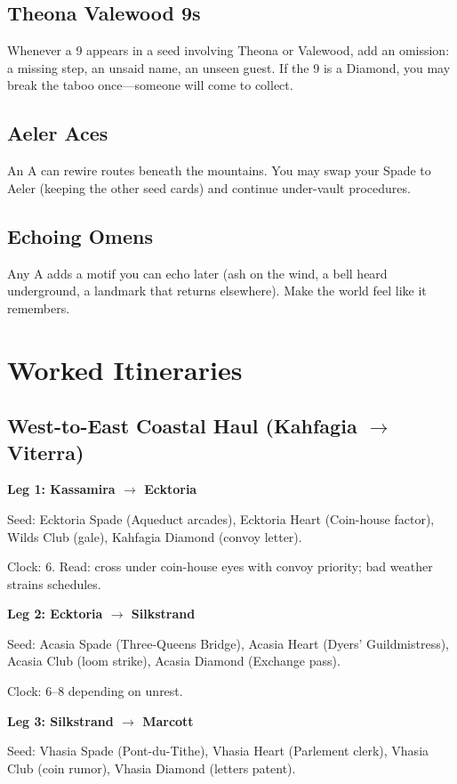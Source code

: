 \subsection{Theona Valewood 9s}
Whenever a 9 appears in a seed involving Theona or Valewood, add an omission: a missing step, an unsaid name, an unseen guest. If the 9 is a Diamond, you may break the taboo once---someone will come to collect.

\subsection{Aeler Aces}
An A can rewire routes beneath the mountains. You may swap your Spade to Aeler (keeping the other seed cards) and continue under-vault procedures.

\subsection{Echoing Omens}
Any A adds a motif you can echo later (ash on the wind, a bell heard underground, a landmark that returns elsewhere). Make the world feel like it remembers.

\section{Worked Itineraries}

\subsection{West-to-East Coastal Haul (Kahfagia $\rightarrow$ Viterra)}

\textbf{Leg 1: Kassamira $\rightarrow$ Ecktoria}

Seed: Ecktoria Spade (Aqueduct arcades), Ecktoria Heart (Coin-house factor), Wilds Club (gale), Kahfagia Diamond (convoy letter).

Clock: 6. Read: cross under coin-house eyes with convoy priority; bad weather strains schedules.

\textbf{Leg 2: Ecktoria $\rightarrow$ Silkstrand}

Seed: Acasia Spade (Three-Queens Bridge), Acasia Heart (Dyers' Guildmistress), Acasia Club (loom strike), Acasia Diamond (Exchange pass).

Clock: 6--8 depending on unrest.

\textbf{Leg 3: Silkstrand $\rightarrow$ Marcott}

Seed: Vhasia Spade (Pont-du-Tithe), Vhasia Heart (Parlement clerk), Vhasia Club (coin rumor), Vhasia Diamond (letters patent).

